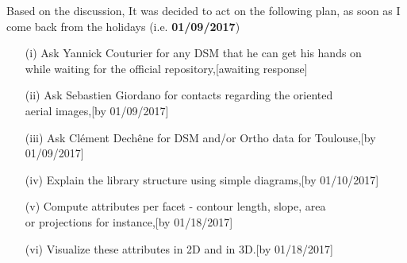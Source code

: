 \documentclass[a4paper, 11pt]{article}
\begin{document}
	Based on the discussion, It was decided to act on the following plan, as soon as I come back from the holidays (i.e. \textbf{01/09/2017})
	\begin{itemize}
		\item[(i)] Ask Yannick Couturier for any DSM that he can get his hands on\\ while waiting for the official repository,\hfill {\color{RedOrange}[awaiting response]}
		\item[(ii)] Ask Sebastien Giordano for contacts regarding the oriented \\aerial images,\hfill {\color{Red}[by 01/09/2017]}
		\item[(iii)] Ask Cl\'ement Dechêne for DSM and/or Ortho data for Toulouse,\hfill {\color{Red}[by 01/09/2017]}
		\item[(iv)] Explain the library structure using simple diagrams,\hfill {\color{Red}[by 01/10/2017]}
		\item[(v)] Compute attributes per facet - contour length, slope, area\\ or projections for instance,\hfill {\color{Red}[by 01/18/2017]}
		\item[(vi)] Visualize these attributes in 2D and in 3D.\hfill {\color{Red}[by 01/18/2017]}
	\end{itemize}
\end{document}
